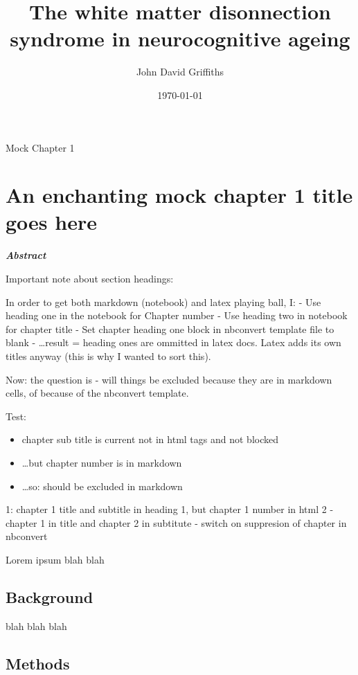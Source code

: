 \documentclass{report}
\title{The white matter disonnection syndrome in neurocognitive ageing}
\date{\today}
\author{John David Griffiths}
\begin{document}
    
    
    
    \maketitle
    
    
    \tableofcontents


    

    {Mock Chapter 1}



    \chapter{An enchanting mock chapter 1 title goes here}


    \textbf{\emph{Abstract}}

    Important note about section headings:

In order to get both markdown (notebook) and latex playing ball, I: -
Use heading one in the notebook for Chapter number - Use heading two in
notebook for chapter title - Set chapter heading one block in nbconvert
template file to blank - \ldots{}result = heading ones are ommitted in
latex docs. Latex adds its own titles anyway (this is why I wanted to
sort this).

    Now: the question is - will things be excluded because they are in
markdown cells, of because of the nbconvert template.

Test:

\begin{itemize}
\item
  chapter sub title is current not in html tags and not blocked
\item
  \ldots{}but chapter number is in markdown
\item
  \ldots{}so: should be excluded in markdown
\end{itemize}

1: chapter 1 title and subtitle in heading 1, but chapter 1 number in
html 2 - chapter 1 in title and chapter 2 in subtitute - switch on
suppresion of chapter in nbconvert

    Lorem ipsum blah blah


    \section{Background}


    blah blah blah


    \section{Methods}
\end{document}

